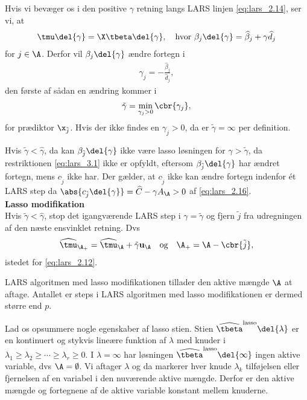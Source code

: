 Hvis vi bevæger os i den positive \(\gamma\) retning langs LARS linjen \eqref{eq:lars_2.14}, ser vi, at
\begin{align*}
\tmu \del{\gamma} = \X \tbeta \del{\gamma}, \quad \text{hvor } \beta_j \del{\gamma} = \widehat{\beta}_j + \gamma \widehat{d}_j
\end{align*}
for \(j \in \A\).
Derfor vil \(\beta_j \del{\gamma}\) ændre fortegn i
\begin{align*}
\gamma_j = -\frac{\widehat{\beta}_j}{\widehat{d}_j},
\end{align*}
den første af sådan en ændring kommer i
\begin{align*}
\tilde{\gamma} = \min_{\gamma_j > 0} \cbr{\gamma_j},
\end{align*}
for prædiktor \(\x_{\tilde{j}}\).
Hvis der ikke findes en \(\gamma_j > 0\), da er \(\tilde{\gamma}=\infty\) per definition.

Hvis \(\tilde{\gamma} < \widehat{\gamma}\), da kan \(\beta_{\tilde{j}} \del{\gamma}\) ikke være lasso løsningen for \(\gamma > \tilde{\gamma}\), da restriktionen \eqref{eq:lars_3.1} ikke er opfyldt, eftersom \(\beta_{\tilde{j}} \del{\gamma}\) har ændret fortegn, mens \(c_{\tilde{j}}\) ikke har.
Der gælder, at \(c_{\tilde{j}}\) ikke kan ændre fortegn indenfor ét LARS step da \(\abs{c_{\tilde{j}} \del{\gamma}} = \widehat{C} - \gamma A_\A> 0\) af \eqref{eq:lars_2.16}. \\[2mm]
%
\textbf{Lasso modifikation} \\
Hvis \(\tilde{\gamma} < \widehat{\gamma}\), stop det igangværende LARS step i \(\gamma = \tilde{\gamma}\) og fjern \(\tilde{j}\) fra udregningen af den næste ensvinklet retning.
Dvs
\begin{align*}
\widehat{\tmu}_{\A_+} = \widehat{\tmu}_\A + \tilde{\gamma} \mathbf{u}_\A \quad \text{og} \quad \A_+ = \A - \cbr{\tilde{j}},
\end{align*}
istedet for \eqref{eq:lars_2.12}.

LARS algoritmen med lasso modifikationen tillader den aktive mængde \(\A\) at aftage.
Antallet er steps i LARS algoritmen med lasso modifikationen er dermed større end \(p\).


Lad os opsummere nogle egenskaber af lasso stien.
Stien \(\widehat{\tbeta}^\text{lasso} \del{\lambda}\) er en kontinuert og stykvis lineære funktion af \(\lambda\) med knuder i \(\lambda_1 \geq \lambda_2 \geq \cdots \geq \lambda_r \geq 0\).
I \(\lambda = \infty\) har løsningen \(\widehat{\tbeta}^\text{lasso} \del{\infty}\) ingen aktive variable, dvs \(\A = \emptyset\). 
Vi aftager \(\lambda\) og da markerer hver knude \(\lambda_k\) tilføjelsen eller fjernelsen af en variabel i den nuværende aktive mængde.
Derfor er den aktive mængde og fortegnene af de aktive variable konstant mellem knuderne.

